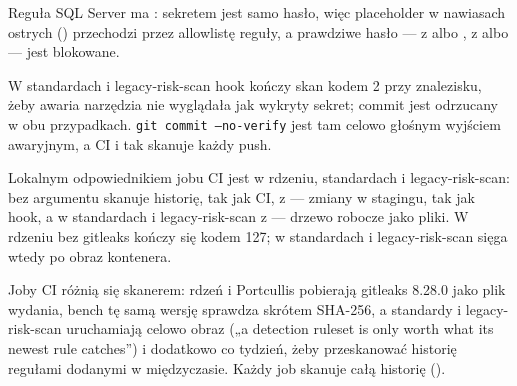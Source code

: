 Reguła SQL Server ma : sekretem jest samo hasło, więc
placeholder w nawiasach ostrych () przechodzi przez allowlistę
reguły, a prawdziwe hasło --- z  albo , z
 albo  --- jest blokowane.

W standardach i legacy-risk-scan hook kończy skan kodem 2 przy znalezisku, żeby awaria
narzędzia nie wyglądała jak wykryty sekret; commit jest odrzucany w obu przypadkach.
\texttt{git commit --no-verify} jest tam celowo głośnym wyjściem awaryjnym, a CI i tak
skanuje każdy push.

Lokalnym odpowiednikiem jobu CI jest  w rdzeniu, standardach
i legacy-risk-scan: bez argumentu skanuje historię, tak jak CI, z  ---
zmiany w stagingu, tak jak hook, a w standardach i legacy-risk-scan z  ---
drzewo robocze jako pliki. W rdzeniu bez gitleaks kończy się kodem 127; w standardach
i legacy-risk-scan sięga wtedy po obraz kontenera.

Joby CI różnią się skanerem: rdzeń i Portcullis pobierają gitleaks 8.28.0 jako plik
wydania, bench tę samą wersję sprawdza skrótem SHA-256, a standardy i legacy-risk-scan
uruchamiają celowo obraz  („a detection ruleset is
only worth what its newest rule catches”) i dodatkowo co tydzień, żeby przeskanować
historię regułami dodanymi w międzyczasie. Każdy job skanuje całą historię
().



